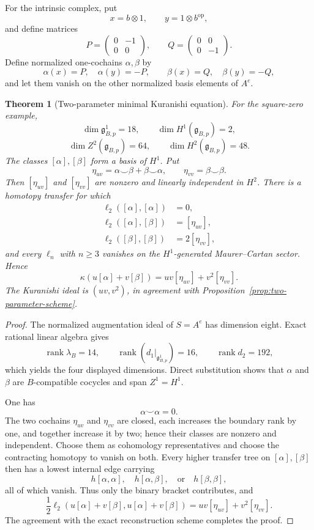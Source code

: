 \documentclass[11pt]{amsart}
\newtheorem{theorem}{Theorem}[section]
\newcommand{\rank}{\operatorname{rank}}
\newcommand{\ghoch}{\mathfrak g}
\begin{document}
For the intrinsic complex, put
\[
x=b\otimes1,
\qquad
y=1\otimes b^{\mathrm{op}},
\]
and define matrices
\[
P=
\begin{pmatrix}0&-1\\0&0\end{pmatrix},
\qquad
Q=
\begin{pmatrix}0&0\\0&-1\end{pmatrix}.
\]
Define normalized one-cochains $\alpha,\beta$ by
\[
\alpha(x)=P,
\quad
\alpha(y)=-P,
\qquad
\beta(x)=Q,
\quad
\beta(y)=-Q,
\]
and let them vanish on the other normalized basis elements of $A^e$.

\begin{theorem}[Two-parameter minimal Kuranishi equation]\label{thm:two-parameter-kuranishi}
For the square-zero example,
\[
\dim\ghoch^1_{B,p}=18,
\qquad
\dim H^1(\ghoch_{B,p})=2,
\]
\[
\dim Z^2(\ghoch_{B,p})=64,
\qquad
\dim H^2(\ghoch_{B,p})=48.
\]
The classes $[\alpha],[\beta]$ form a basis of $H^1$.  Put
\[
\eta_{uv}=\alpha\smile\beta+\beta\smile\alpha,
\qquad
\eta_{vv}=\beta\smile\beta.
\]
Then $[\eta_{uv}]$ and $[\eta_{vv}]$ are nonzero and linearly independent in $H^2$.  There is a homotopy transfer for which
\begin{align*}
\ell_2([\alpha],[\alpha])&=0,\\
\ell_2([\alpha],[\beta])&=[\eta_{uv}],\\
\ell_2([\beta],[\beta])&=2[\eta_{vv}],
\end{align*}
and every $\ell_n$ with $n\ge3$ vanishes on the $H^1$-generated Maurer--Cartan sector.  Hence
\[
\boxed{
\kappa(u[\alpha]+v[\beta])
=
uv[\eta_{uv}]+v^2[\eta_{vv}].
}
\]
The Kuranishi ideal is $(uv,v^2)$, in agreement with Proposition~\ref{prop:two-parameter-scheme}.
\end{theorem}

\begin{proof}
The normalized augmentation ideal of $S=A^e$ has dimension eight.  Exact rational linear algebra gives
\[
\rank\lambda_B=14,
\qquad
\rank(d_1|_{\ghoch^1_{B,p}})=16,
\qquad
\rank d_2=192,
\]
which yields the four displayed dimensions.  Direct substitution shows that $\alpha$ and $\beta$ are $B$-compatible cocycles and span $Z^1=H^1$.

One has
\[
\alpha\smile\alpha=0.
\]
The two cochains $\eta_{uv}$ and $\eta_{vv}$ are closed, each increases the boundary rank by one, and together increase it by two; hence their classes are nonzero and independent.  Choose them as cohomology representatives and choose the contracting homotopy to vanish on both.  Every higher transfer tree on $[\alpha],[\beta]$ then has a lowest internal edge carrying
\[
h[\alpha,\alpha],
\quad
h[\alpha,\beta],
\quad\text{or}\quad
h[\beta,\beta],
\]
all of which vanish.  Thus only the binary bracket contributes, and
\[
\frac12\ell_2(u[\alpha]+v[\beta],u[\alpha]+v[\beta])
=
uv[\eta_{uv}]+v^2[\eta_{vv}].
\]
The agreement with the exact reconstruction scheme completes the proof.
\end{proof}
\end{document}
